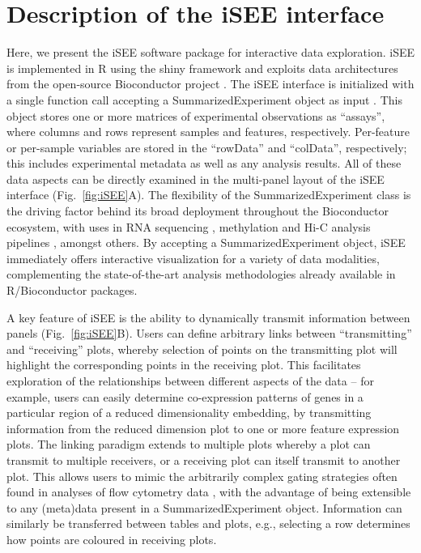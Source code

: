 \documentclass{bioinfo}
\begin{document}
\section{Description of the iSEE interface}
Here, we present the iSEE software package for interactive data exploration.
iSEE is implemented in R using the shiny framework \citep{chang2017shiny} and exploits data architectures from the open-source Bioconductor project \citep{gentleman2004bioconductor}.
The iSEE interface is initialized with a single function call accepting a SummarizedExperiment object as input \citep{huber2015orchestrating}.
This object stores one or more matrices of experimental observations as ``assays'', where columns and rows represent samples and features, respectively. 
Per-feature or per-sample variables are stored in the ``rowData'' and ``colData'', respectively; this includes experimental metadata as well as any analysis results.
All of these data aspects can be directly examined in the multi-panel layout of the iSEE interface (Fig.~\ref{fig:iSEE}A).
The flexibility of the SummarizedExperiment class is the driving factor behind its broad deployment throughout the Bioconductor ecosystem, with uses in RNA sequencing \citep{love2014moderated}, methylation \citep{aryee2014minfi} and Hi-C analysis pipelines \citep{lun2016infrastructure}, amongst others.
By accepting a SummarizedExperiment object, iSEE immediately offers interactive visualization for a variety of data modalities, complementing the state-of-the-art analysis methodologies already available in R/Bioconductor packages. 

A key feature of iSEE is the ability to dynamically transmit information between panels (Fig.~\ref{fig:iSEE}B).
Users can define arbitrary links between ``transmitting'' and ``receiving'' plots, whereby selection of points on the transmitting plot will highlight the corresponding points in the receiving plot. 
This facilitates exploration of the relationships between different aspects of the data -- for example, users can easily determine co-expression patterns of genes in a particular region of a reduced dimensionality embedding, by transmitting information from the reduced dimension plot to one or more feature expression plots. 
The linking paradigm extends to multiple plots whereby a plot can transmit to multiple receivers, or a receiving plot can itself transmit to another plot.
This allows users to mimic the arbitrarily complex gating strategies often found in analyses of flow cytometry data \citep{finak2014opencyto}, with the advantage of being extensible to any (meta)data present in a SummarizedExperiment object. 
Information can similarly be transferred between tables and plots, e.g., selecting a row determines how points are coloured in receiving plots.
\end{document}

